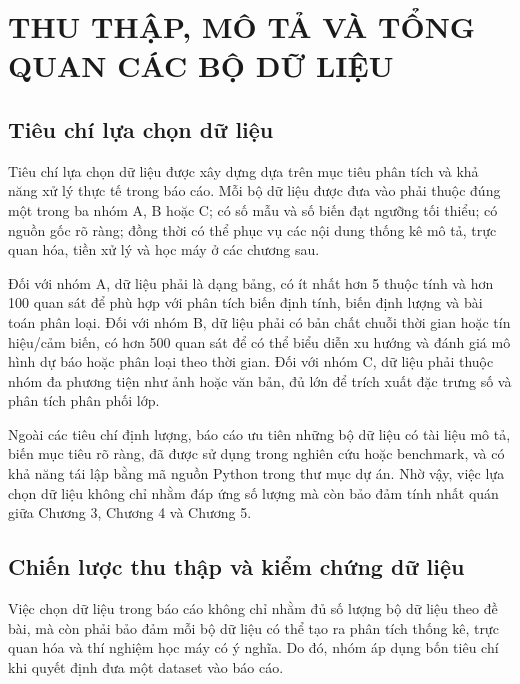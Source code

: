 ﻿\chapter{THU THẬP, MÔ TẢ VÀ TỔNG QUAN CÁC BỘ DỮ LIỆU}

\startcontents[chapters]

\section{Tiêu chí lựa chọn dữ liệu}

Tiêu chí lựa chọn dữ liệu được xây dựng dựa trên mục tiêu phân tích và khả năng xử lý thực tế trong báo cáo. Mỗi bộ dữ liệu được đưa vào phải thuộc đúng một trong ba nhóm A, B hoặc C; có số mẫu và số biến đạt ngưỡng tối thiểu; có nguồn gốc rõ ràng; đồng thời có thể phục vụ các nội dung thống kê mô tả, trực quan hóa, tiền xử lý và học máy ở các chương sau.

Đối với nhóm A, dữ liệu phải là dạng bảng, có ít nhất hơn 5 thuộc tính và hơn 100 quan sát để phù hợp với phân tích biến định tính, biến định lượng và bài toán phân loại. Đối với nhóm B, dữ liệu phải có bản chất chuỗi thời gian hoặc tín hiệu/cảm biến, có hơn 500 quan sát để có thể biểu diễn xu hướng và đánh giá mô hình dự báo hoặc phân loại theo thời gian. Đối với nhóm C, dữ liệu phải thuộc nhóm đa phương tiện như ảnh hoặc văn bản, đủ lớn để trích xuất đặc trưng số và phân tích phân phối lớp.

Ngoài các tiêu chí định lượng, báo cáo ưu tiên những bộ dữ liệu có tài liệu mô tả, biến mục tiêu rõ ràng, đã được sử dụng trong nghiên cứu hoặc benchmark, và có khả năng tái lập bằng mã nguồn Python trong thư mục dự án. Nhờ vậy, việc lựa chọn dữ liệu không chỉ nhằm đáp ứng số lượng mà còn bảo đảm tính nhất quán giữa Chương 3, Chương 4 và Chương 5.

\section{Chiến lược thu thập và kiểm chứng dữ liệu}

Việc chọn dữ liệu trong báo cáo không chỉ nhằm đủ số lượng bộ dữ liệu theo đề bài, mà còn phải bảo đảm mỗi bộ dữ liệu có thể tạo ra phân tích thống kê, trực quan hóa và thí nghiệm học máy có ý nghĩa. Do đó, nhóm áp dụng bốn tiêu chí khi quyết định đưa một dataset vào báo cáo.

